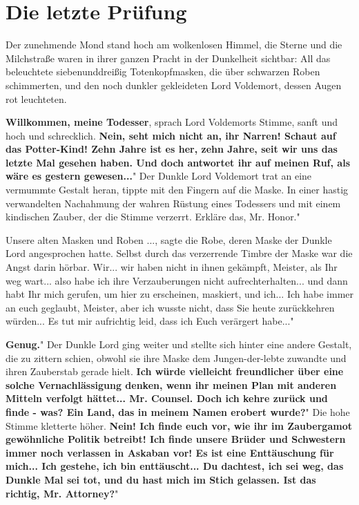 \chapter{Die letzte Prüfung}

Der zunehmende Mond stand hoch am wolkenlosen Himmel, die Sterne und die
Milchstraße waren in ihrer ganzen Pracht in der Dunkelheit sichtbar: All das
beleuchtete siebenunddreißig Totenkopfmasken, die über schwarzen Roben
schimmerten, und den noch dunkler gekleideten Lord Voldemort, dessen Augen rot
leuchteten.

\glqq \textbf{Willkommen, meine Todesser}\grqq{}, sprach Lord Voldemorts Stimme,
sanft und hoch und schrecklich. \glqq \textbf{Nein, seht mich nicht an, ihr
Narren! Schaut auf das Potter-Kind! Zehn Jahre ist es her, zehn Jahre, seit wir
uns das letzte Mal gesehen haben. Und doch antwortet ihr auf meinen Ruf, als
wäre es gestern gewesen...}" Der Dunkle Lord Voldemort trat an eine vermummte
Gestalt heran, tippte mit den Fingern auf die Maske. \glqq In einer hastig
verwandelten Nachahmung der wahren Rüstung eines Todessers und mit einem
kindischen Zauber, der die Stimme verzerrt. Erkläre das, Mr. Honor."

\glqq Unsere alten Masken und Roben ...\grqq{}, sagte die Robe, deren Maske der
Dunkle Lord angesprochen hatte. Selbst durch das verzerrende Timbre der Maske
war die Angst darin hörbar. \glqq Wir... wir haben nicht in ihnen gekämpft,
Meister, als Ihr weg wart... also habe ich ihre Verzauberungen nicht
aufrechterhalten... und dann habt Ihr mich gerufen, um hier zu erscheinen,
maskiert, und ich... Ich habe immer an euch geglaubt, Meister, aber ich wusste
nicht, dass Sie heute zurückkehren würden... Es tut mir aufrichtig leid, dass
ich Euch verärgert habe..."

\glqq \textbf{Genug.}" Der Dunkle Lord ging weiter und stellte sich hinter eine
andere Gestalt, die zu zittern schien, obwohl sie ihre Maske dem
Jungen-der-lebte zuwandte und ihren Zauberstab gerade hielt. \glqq \textbf{Ich
würde vielleicht freundlicher über eine solche Vernachlässigung denken, wenn ihr
meinen Plan mit anderen Mitteln verfolgt hättet... Mr. Counsel. Doch ich kehre
zurück und finde - was? Ein Land, das in meinem Namen erobert wurde?}" Die hohe
Stimme kletterte höher. \glqq \textbf{Nein! Ich finde euch vor, wie ihr im
Zaubergamot gewöhnliche Politik betreibt! Ich finde unsere Brüder und Schwestern
immer noch verlassen in Askaban vor! Es ist eine Enttäuschung für mich... Ich
gestehe, ich bin enttäuscht... Du dachtest, ich sei weg, das Dunkle Mal sei tot,
und du hast mich im Stich gelassen. Ist das richtig, Mr. Attorney?}"

